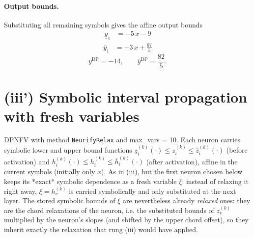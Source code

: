 \documentclass[11pt]{article}
\begin{document}
\paragraph{Output bounds.}
Substituting all remaining symbols gives the affine output bounds
\begin{align*}
\underline{y}_{1} &= -5\,x - 9
\end{align*}
\begin{align*}
\overline{y}_{1} &= -3\,x + \frac{67}{5}
\end{align*}
\begin{equation*}
\underline{y}^{\text{DP}} = -14, \qquad \overline{y}^{\text{DP}} = \frac{82}{5}.
\end{equation*}

\section{(iii') Symbolic interval propagation with fresh variables}
DPNFV with method \texttt{NeurifyRelax} and max\_vars = 10. Each neuron carries symbolic lower and upper bound functions
$\underline{z}^{(k)}_i(\cdot) \le z^{(k)}_i \le \overline{z}^{(k)}_i(\cdot)$ (before activation)
and $\underline{h}^{(k)}_i(\cdot) \le h^{(k)}_i \le \overline{h}^{(k)}_i(\cdot)$ (after activation),
affine in the current symbols (initially only $x$).
As in (iii), but the first neuron chosen below keeps its *exact*
symbolic dependence as a fresh variable $\xi$: instead of relaxing it right away, $\xi = h^{(k)}_v$
is carried symbolically and only substituted at the next layer. The stored symbolic bounds of $\xi$
are nevertheless already \emph{relaxed} ones: they are the chord relaxations of the neuron, i.e.
the substituted bounds of $z^{(k)}_v$ multiplied by the neuron's slopes (and shifted by the upper
chord offset), so they inherit exactly the relaxation that rung (iii) would have applied.
\end{document}
